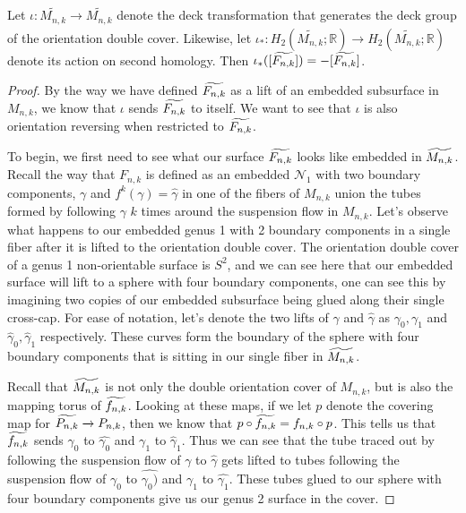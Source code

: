 \begin{lem}
Let $\iota: \widetilde{M_{n,k}} \xrightarrow[]{} \widetilde{M_{n,k}}$ denote the deck transformation that generates the deck group of the orientation double cover. Likewise, let $\iota_*: H_2(\widetilde{M_{n,k}};\mathbb{R}) \xrightarrow[]{} H_2(\widetilde{M_{n,k}};\mathbb{R})$ denote its action on second homology. Then $\iota_*([\widetilde{F_{n,k}}]) = -[\widetilde{F_{n,k}}]$.
\end{lem}
\begin{proof}

By the way we have defined $\widetilde{F_{n,k}}$ as a lift of an embedded subsurface in $M_{n,k}$, we know that $\iota$ sends $\widetilde{F_{n,k}}$ to itself. We want to see that $\iota$ is also orientation reversing when restricted to $\widetilde{F_{n,k}}$.

To begin, we first need to see what our surface $\widetilde{F_{n,k}}$ looks like embedded in $\widetilde{M_{n,k}}$. Recall the way that $F_{n,k}$ is defined as an embedded $\mathcal{N}_1$ with two boundary components, $\gamma$ and $f^k(\gamma) = \hat{\gamma}$ in one of the fibers of $M_{n,k}$ union the tubes formed by following $\gamma$ $k$ times around the suspension flow in $M_{n,k}$. Let's observe what happens to our embedded genus 1 with 2 boundary components in a single fiber after it is lifted to the orientation double cover. The orientation double cover of a genus 1 non-orientable surface is $S^2$, and we can see here that our embedded surface will lift to a sphere with four boundary components, one can see this by imagining two copies of our embedded subsurface being glued along their single cross-cap. For ease of notation, let's denote the two lifts of $\gamma$ and $\hat{\gamma}$ as $\gamma_0,\gamma_1$ and $\hat{\gamma}_0,\hat{\gamma}_1$ respectively. These curves form the boundary of the sphere with four boundary components that is sitting in our single fiber in $\widetilde{M_{n,k}}$.

Recall that $\widetilde{M_{n,k}}$ is not only the double orientation cover of $M_{n,k}$, but is also the mapping torus of $\widetilde{f_{n,k}}$. Looking at these maps, if we let $p$ denote the covering map for $\widetilde{P_{n,k}} \xrightarrow[]{} P_{n,k}$, then we know that $p \circ \widetilde{f_{n,k}} = f_{n,k} \circ p$. This tells us that $\widetilde{f_{n,k}}$ sends $\gamma_0$ to $\hat{\gamma_0}$ and $\gamma_1$ to $\hat{\gamma}_1$. Thus we can see that the tube traced out by following the suspension flow of $\gamma$ to $\hat{\gamma}$ gets lifted to tubes following the suspension flow of $\gamma_0$ to $\hat{\gamma_0)}$ and $\gamma_1$ to $\hat{\gamma_1}$. These tubes glued to our sphere with four boundary components give us our genus 2 surface in the cover.


\end{proof}
